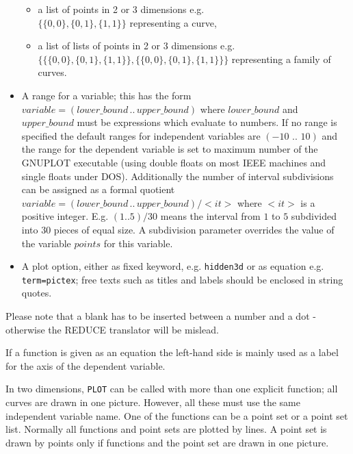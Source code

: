 \begin{itemize}
\begin{itemize}
    \item a list of points in 2 or 3 dimensions
         e.g. \\ $\{\{0,0\},\{0,1\},\{1,1\}\}$ representing
         a curve,

    \item a list of lists of points in 2 or 3 dimensions
         e.g.\\ $\{\{\{0,0\},\{0,1\},\{1,1\}\},
                 \{\{0,0\},\{0,1\},\{1,1\}\}\}$
         representing a family of curves.
  \end{itemize}

\item A range for a variable; this has the form\\
    $variable=(lower\_bound\, . . \, upper\_bound)$ where
  $lower\_bound$ and $upper\_bound$ must be expressions which
  evaluate to numbers. If no range is specified the
  default ranges for independent variables are $(-10\,\,..\,\,10)$
  and the range for the dependent variable is set to 
  maximum number of the GNUPLOT executable (using double
  floats on most IEEE machines and single floats under DOS).
  Additionally the number of interval subdivisions can be
  assigned as a formal quotient\\
    $variable=(lower\_bound\, . . \, upper\_bound)/<it>$
  where $<it>$ is a positive integer. E.g.
    $(1 .. 5)/30$ means the interval from $1$ to $5$
  subdivided into $30$ pieces of equal size. A subdivision
  parameter overrides the value of the variable $points$
  for this variable.
  


\item A plot option, either as fixed keyword,
  e.g. \verb$hidden3d$ or as equation e.g. \verb$term=pictex$;
  free texts such as titles and labels should be enclosed in
  string quotes.
\end{itemize}
Please note that a blank has to be inserted between a number
and a dot - otherwise the REDUCE translator will be mislead.
 
If a function is given as an equation the left-hand side
  is mainly used as a label for the axis of the dependent variable.

In two dimensions,  \verb+PLOT+ can be called with
more than one explicit function; all curves 
are drawn in one picture. However,
all these must use the same independent variable name.
One of the functions can be a point set or a point set list.
Normally all functions and point sets are plotted by
lines. A point set is drawn by points only if functions and 
the point set are drawn in one picture.

